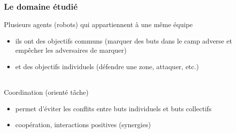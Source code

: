 \documentclass{beamer}
\begin{document}
\begin{frame}
\frametitle{Le domaine étudié}
Plusieurs agents (robots) qui appartiennent à une même équipe
\begin{itemize}
	\item ils ont des objectifs communs (marquer des buts dans le camp adverse et empêcher les adversaires de marquer)
	\item et des objectifs individuels (défendre une zone, attaquer, etc.)
\end{itemize}
~\\
Coordination (orienté tâche)
\begin{itemize}
	\item permet d'éviter les conflits entre buts individuels et buts collectifs
	\item coopération, interactions positives (synergies) %
\end{itemize}
\end{frame}


\end{document}
